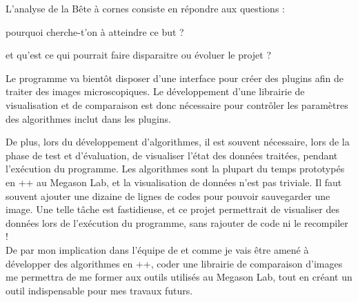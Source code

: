 L'analyse de la Bête à cornes consiste en répondre aux questions :
\begin{inparaenum}[(i)] 
  \item pourquoi cherche-t'on à atteindre ce but ?
  \item et qu'est ce qui pourrait faire disparaitre ou évoluer le projet ?
\end{inparaenum}

Le programme {\gofigure} va bientôt disposer d'une interface pour créer des plugins afin de traiter des images microscopiques.
Le développement d'une librairie de visualisation et de comparaison est donc nécessaire
pour contrôler les paramètres des algorithmes inclut dans les plugins.

De plus, lors du développement d'algorithmes,
il est souvent nécessaire, lors de la phase de test et d'évaluation,
de visualiser l'état des données traitées, pendant l'exécution du programme.
Les algorithmes sont la plupart du temps prototypés en \C++ au Megason Lab, et la visualisation de données n'est pas triviale.
Il faut souvent ajouter une dizaine de lignes de codes pour pouvoir sauvegarder une image.
Une telle tâche est fastidieuse, et ce projet permettrait de visualiser
des données lors de l'exécution du programme, sans rajouter de code ni le recompiler !\\

De par mon implication dans l'équipe de {\gofigure} et
comme je vais être amené à développer des algorithmes en {\C++},
coder une librairie de comparaison d'images me permettra de me former aux outils utilisés au Megason Lab,
tout en créant un outil indispensable pour mes travaux futurs.

